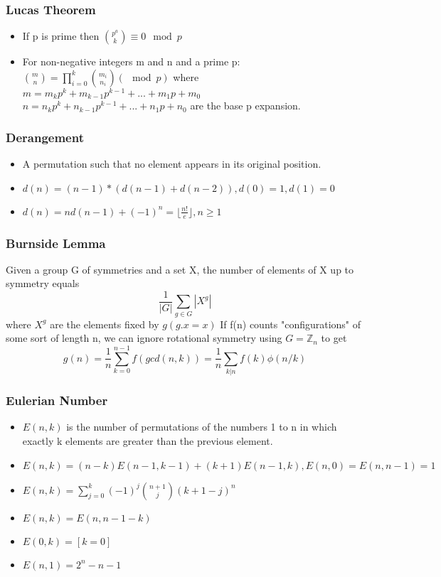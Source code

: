\subsubsection{Lucas Theorem}
\vspace{2.5mm}
\begin{itemize}
    \item If p is prime then $\binom{p^a}{k}\equiv 0\mod p$
    \item For non-negative integers m and n and a prime p:\\
    $\binom{m}{n} = \prod\limits_{i=0}^k \binom{m_i}{n_i}(\mod p)$ where \\
    $m = m_kp^k+m_{k-1}p^{k-1}+...+m_1p+m_0$
    $n = n_kp^k+n_{k-1}p^{k-1}+...+n_1p+n_0$
    are the base p expansion.
\end{itemize}
\subsubsection{Derangement}
\vspace{2.5mm}
\begin{itemize}
    \item A permutation such that no element appears in its original position.
    \item $d(n) = (n-1)*(d(n-1)+d(n-2)),d(0) = 1, d(1) = 0$
    \item $d(n) =nd(n-1)+(-1)^n = \lfloor{\frac{n!}{e}}\rfloor, n\geq1$
\end{itemize}
\subsubsection{Burnside Lemma}
\vspace{2.5mm}
Given a group G of symmetries and a set X, the number of elements of X up to symmetry equals
$$\frac{1}{|G|} \sum\limits_{g \in G} |X^g|$$ where $X^g$ are the elements fixed by $g (g.x = x)$
If f(n) counts "configurations" of some sort of length n, we can ignore rotational symmetry using $G = \mathbb{Z}_n$ to get
$$g(n) = \frac{1}{n} \sum\limits_{k=0}^{n-1}f(gcd(n,k))= \frac{1}{n}\sum\limits_{k|n}f(k)\phi(n/k)$$

\subsubsection{Eulerian Number}
\vspace{2.5mm}
\begin{itemize}
    \item $E(n,k)$ is the number of permutations of the numbers 1 to n in which exactly k elements are greater than the previous element.
    \item $E(n,k) = (n-k)E(n-1, k-1)+(k+1)E(n-1,k), E(n,0) = E(n,n-1) = 1$
    \item $E(n,k) = \sum\limits_{j=0}^k (-1)^j \binom{n+1}{j}(k+1-j)^n$
    \item $E(n,k) = E(n, n-1-k)$
    \item $E(0,k) = [k=0]$
    \item $E(n,1) = 2^n - n - 1$
\end{itemize}

